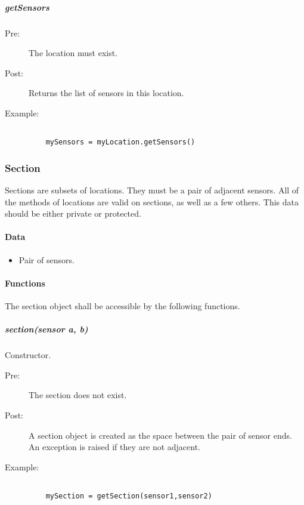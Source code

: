\documentclass[a4paper,11pt,notitlepage]{article}
\begin{document}
\subparagraph{getSensors}
\begin{description}
\item[\hspace{1cm}Pre:] The location must exist.
\item[\hspace{1cm}Post:] Returns the list of sensors in this location.
\item[\hspace{1cm}Example:]
\begin{verbatim}

    mySensors = myLocation.getSensors()
\end{verbatim}
\end{description}

\subsubsection{Section}
Sections are subsets of locations. They must be a pair of adjacent sensors. All of the methods of locations are valid on sections, as well as a few others. This data should be either private or protected.
\paragraph{Data}
\begin{itemize}
\item Pair of sensors.
\end{itemize}
\paragraph{Functions}
The section object shall be accessible by the following functions.
\subparagraph{section(sensor a, b)} Constructor.
\begin{description}
\item[\hspace{1cm}Pre:] The section does not exist.
\item[\hspace{1cm}Post:] A section object is created as the space between the pair of sensor ends. An exception is raised if they are not adjacent.
\item[\hspace{1cm}Example:]
\begin{verbatim}

    mySection = getSection(sensor1,sensor2)
\end{verbatim}
\end{description}
\end{document}
